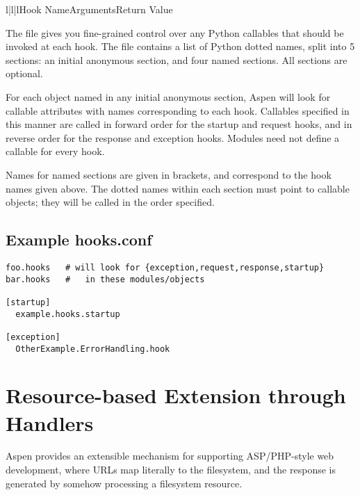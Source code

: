 \begin{tableiii}{l|l|l}{}{Hook Name}{Arguments}{Return Value}
\end{tableiii}

The  file gives you fine-grained control over any Python
callables that should be invoked at each hook. The file contains a list of
Python dotted names, split into 5 sections: an initial anonymous section, and
four named sections. All sections are optional.

For each object named in any initial anonymous section, Aspen will look for
callable attributes with names corresponding to each hook. Callables specified
in this manner are called in forward order for the startup and request hooks,
and in reverse order for the response and exception hooks. Modules need not
define a callable for every hook.

Names for named sections are given in brackets, and correspond to the hook names
given above. The dotted names within each section must point to callable
objects; they will be called in the order specified.

\subsection{Example hooks.conf \label{hooks.conf}}

\begin{verbatim}
foo.hooks   # will look for {exception,request,response,startup}
bar.hooks   #   in these modules/objects

[startup]
  example.hooks.startup

[exception]
  OtherExample.ErrorHandling.hook
\end{verbatim}

\section{Resource-based Extension through Handlers}

Aspen provides an extensible mechanism for supporting ASP/PHP-style web
development, where URLs map literally to the filesystem, and the response is
generated by somehow processing a filesystem resource.


